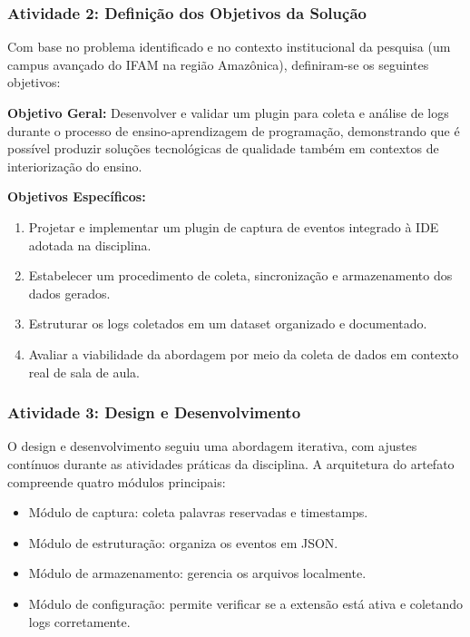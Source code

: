 \subsubsection{Atividade 2: Definição dos Objetivos da Solução}

Com base no problema identificado e no contexto institucional da pesquisa (um campus avançado do IFAM na região Amazônica), definiram-se os seguintes objetivos:

\textbf{Objetivo Geral:} Desenvolver e validar um plugin para coleta e análise de logs durante o processo de ensino-aprendizagem de programação, demonstrando que é possível produzir soluções tecnológicas de qualidade também em contextos de interiorização do ensino.

\textbf{Objetivos Específicos:}
\begin{enumerate}
    \item Projetar e implementar um plugin de captura de eventos integrado à IDE adotada na disciplina.
    \item Estabelecer um procedimento de coleta, sincronização e armazenamento dos dados gerados.
    \item Estruturar os logs coletados em um dataset organizado e documentado.
    \item Avaliar a viabilidade da abordagem por meio da coleta de dados em contexto real de sala de aula.
\end{enumerate}

\subsubsection{Atividade 3: Design e Desenvolvimento}

O design e desenvolvimento seguiu uma abordagem iterativa, com ajustes contínuos durante as atividades práticas da disciplina. A arquitetura do artefato compreende quatro módulos principais:

\begin{itemize}
    \item Módulo de captura: coleta palavras reservadas e timestamps.
    \item Módulo de estruturação: organiza os eventos em JSON.
    \item Módulo de armazenamento: gerencia os arquivos localmente.
    \item Módulo de configuração: permite verificar se a extensão está ativa e coletando logs corretamente.
\end{itemize}

